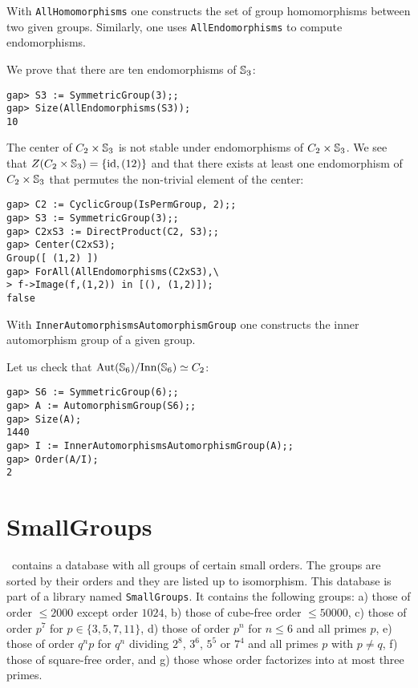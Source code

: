 With \lstinline{AllHomomorphisms} one constructs the set of group homomorphisms
between two given groups.  Similarly, one uses \lstinline{AllEndomorphisms} to
compute endomorphisms.

\begin{example}
We prove that there are ten endomorphisms of $\mathbb{S}_3$:
\begin{lstlisting}
gap> S3 := SymmetricGroup(3);;
gap> Size(AllEndomorphisms(S3));
10
\end{lstlisting}
\end{example}

\begin{example}
The center of $C_2\times\mathbb{S}_3$ is not stable under endomorphisms of 
$C_2\times\mathbb{S}_3$. We see that 
$Z(C_2\times\mathbb{S}_3)=\{\operatorname{id},(12)\}$ and 
that there exists at least one endomorphism of $C_2\times\mathbb{S}_3$ that permutes 
the non-trivial element of the center:
\begin{lstlisting}
gap> C2 := CyclicGroup(IsPermGroup, 2);;
gap> S3 := SymmetricGroup(3);;
gap> C2xS3 := DirectProduct(C2, S3);;
gap> Center(C2xS3);
Group([ (1,2) ])
gap> ForAll(AllEndomorphisms(C2xS3),\
> f->Image(f,(1,2)) in [(), (1,2)]);
false
\end{lstlisting}
\end{example}

With \lstinline{InnerAutomorphismsAutomorphismGroup} one constructs the inner
automorphism group of a given group.

\begin{example}
Let us check that $\operatorname{Aut}(\mathbb{S}_6)/\mathrm{Inn}(\mathbb{S}_6)\simeq C_2$: 
\begin{lstlisting}
gap> S6 := SymmetricGroup(6);;
gap> A := AutomorphismGroup(S6);;
gap> Size(A);
1440
gap> I := InnerAutomorphismsAutomorphismGroup(A);;
gap> Order(A/I);
2
\end{lstlisting}
\end{example}

\section{SmallGroups}
\label{SmallGroups}

\GAP~contains a database with all groups of certain small orders. The groups
are sorted by their orders and they are listed up to isomorphism. This database
is part of a library named \lstinline{SmallGroups}.  It contains the following
groups: a) those of order $\leq2000$ except order $1024$, b) those of cube-free
order $\leq 50000$, c) those of order $p^7$ for $p\in\{3,5,7,11\}$, d) those of
order $p^n$ for $n\leq 6$ and all primes $p$, e) those of order $q^np$ for
$q^n$ dividing $2^8$, $3^6$, $5^5$ or $7^4$ and all primes $p$ with $p\ne q$,
f) those of square-free order, and g) those whose order factorizes into at most
three primes.  

